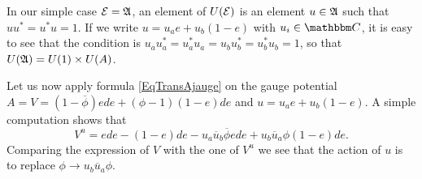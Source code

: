 In our simple case $\mathcal{E}=\mathfrak{A}$, an element of $U(\mathcal{E})$ is an element $u\in\mathfrak{A}$ such that $uu^*=u^*u=1$. If we write $u=u_ae+u_b(1-e)$ with $u_i\in\eC$, it is easy to see that the condition is $u_au_a^*=u_a^*u_a= u_bu_b^*=u_b^*u_b=1$, so that $U(\mathfrak{A})=U(1)\times U(A)$.

Let us now apply formula \eqref{EqTransAjauge} on the gauge potential $A=V=(1-\overline{ \phi })ede+(\phi-1)(1-e)de$ and $u=u_ae+u_b(1-e)$. A simple computation shows that 
\[ 
  V^u=ede-(1-e)de-u_a\overline{ u }_b\overline{ \phi }ede+u_b\overline{ u }_a\phi(1-e)de.
\]
Comparing the expression of $V$ with the one of $V^u$ we see that the action of $u$ is to replace $\phi\to u_b\overline{ u }_a\phi$.
